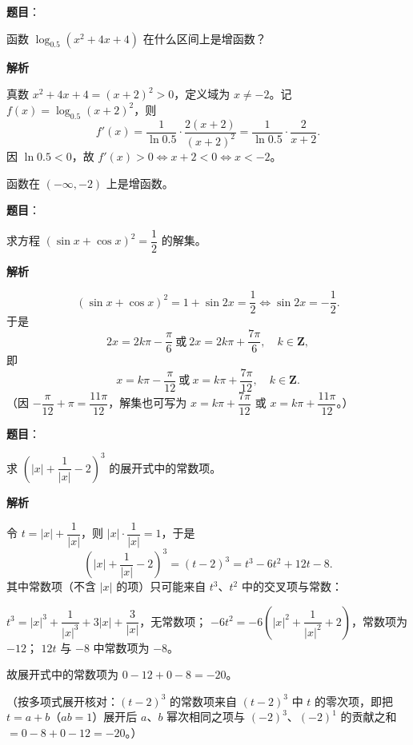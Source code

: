 \begin{answer}

\textbf{题目}：

函数 $\log_{0.5}(x^2+4x+4)$ 在什么区间上是增函数？

\textbf{解析}

真数 $x^2+4x+4=(x+2)^2>0$，定义域为 $x\ne-2$。记 $f(x)=\log_{0.5}(x+2)^2$，则
\nopagebreak[4]
\[
f'(x)=\frac{1}{\ln0.5}\cdot\frac{2(x+2)}{(x+2)^2}=\frac{1}{\ln0.5}\cdot\frac{2}{x+2}.
\]
因 $\ln0.5<0$，故 $f'(x)>0\iff x+2<0\iff x<-2$。

函数在 $(-\infty,-2)$ 上是增函数。


\end{answer}
\begin{answer}

\textbf{题目}：

求方程 $(\sin x+\cos x)^2=\dfrac12$ 的解集。

\textbf{解析}

\nopagebreak[4]
\[
(\sin x+\cos x)^2=1+\sin2x=\frac12\iff \sin2x=-\frac12.
\]
于是
\nopagebreak[4]
\[
2x=2k\pi-\frac\pi6\ \text{或}\ 2x=2k\pi+\frac{7\pi}6,\quad k\in\mathbf{Z},
\]
即
\nopagebreak[4]
\[
x=k\pi-\frac\pi{12}\ \text{或}\ x=k\pi+\frac{7\pi}{12},\quad k\in\mathbf{Z}.
\]
（因 $-\dfrac\pi{12}+\pi=\dfrac{11\pi}{12}$，解集也可写为 $x=k\pi+\dfrac{7\pi}{12}$ 或 $x=k\pi+\dfrac{11\pi}{12}$。）


\end{answer}
\begin{answer}

\textbf{题目}：

求 $\left(|x|+\dfrac{1}{|x|}-2\right)^3$ 的展开式中的常数项。

\textbf{解析}

令 $t=|x|+\dfrac1{|x|}$，则 $|x|\cdot\dfrac1{|x|}=1$，于是
\nopagebreak[4]
\[
\left(|x|+\frac1{|x|}-2\right)^3=(t-2)^3=t^3-6t^2+12t-8.
\]
其中常数项（不含 $|x|$ 的项）只可能来自 $t^3$、$t^2$ 中的交叉项与常数：

$t^3=|x|^3+\dfrac1{|x|^3}+3|x|+\dfrac3{|x|}$，无常数项；
$-6t^2=-6\left(|x|^2+\dfrac1{|x|^2}+2\right)$，常数项为 $-12$；
$12t$ 与 $-8$ 中常数项为 $-8$。

故展开式中的常数项为 $0-12+0-8=-20$。

（按多项式展开核对：$(t-2)^3$ 的常数项来自 $(t-2)^3$ 中 $t$ 的零次项，即把 $t=a+b$（$ab=1$）展开后 $a$、$b$ 幂次相同之项与 $(-2)^3$、$(-2)^1$ 的贡献之和 $=0-8+0-12=-20$。）


\end{answer}

